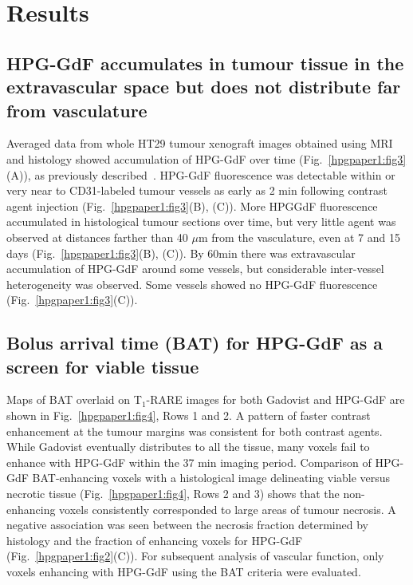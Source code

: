 \section{Results}

\subsection{HPG-GdF accumulates in tumour tissue in the extravascular space but does not distribute far from vasculature}

Averaged data from whole HT29 tumour xenograft images obtained using MRI and histology showed accumulation of \acs{HPG-GdF} over time (Fig.~\ref{hpgpaper1:fig3}(A)), as previously described~\cite{Saatchi:2012hc}.
HPG-GdF fluorescence was detectable within or very near to \acs{CD31}-labeled tumour vessels as early as 2 min following contrast agent injection (Fig.~\ref{hpgpaper1:fig3}(B), (C)).
More HPGGdF fluorescence accumulated in histological tumour sections over time, but very little agent was observed at distances farther than 40 $\mu$m from the vasculature, even at 7 and 15 days (Fig.~\ref{hpgpaper1:fig3}(B), (C)).
By 60min there was extravascular accumulation of \acs{HPG-GdF} around some vessels, but considerable inter-vessel heterogeneity was observed.
Some vessels showed no \acs{HPG-GdF} fluorescence (Fig.~\ref{hpgpaper1:fig3}(C)).

\subsection{Bolus arrival time (BAT) for \acs{HPG-GdF} as a screen for viable tissue}

Maps of \acs{BAT} overlaid on T$_1$-RARE images for both Gadovist and \acs{HPG-GdF} are shown in Fig.~\ref{hpgpaper1:fig4}, Rows 1 and 2.
A pattern of faster contrast enhancement at the tumour margins was consistent for both contrast agents.
While Gadovist eventually distributes to all the tissue, many voxels fail to enhance with \acs{HPG-GdF} within the 37 min imaging period.
Comparison of \acs{HPG-GdF} \acs{BAT}-enhancing voxels with a histological image delineating viable versus necrotic tissue (Fig.~\ref{hpgpaper1:fig4}, Rows 2 and 3) shows that the non-enhancing voxels consistently corresponded to large areas of tumour necrosis.
A negative association was seen between the necrosis fraction determined by histology and the fraction of enhancing voxels for \acs{HPG-GdF} (Fig.~\ref{hpgpaper1:fig2}(C)).
For subsequent analysis of vascular function, only voxels enhancing with \acs{HPG-GdF} using the \acs{BAT} criteria were evaluated.

